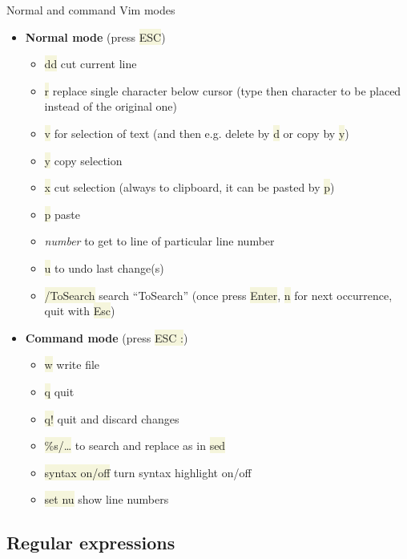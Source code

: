 \documentclass[compress, ucs, xelatex, 11pt, xcolor=svgnames, aspectratio=169,
	hyperref={
		bookmarks=true,
		unicode=true,
		colorlinks=true,
		pdftitle={Linux, command line and MetaCentrum},
		plainpages=false,
		pdfauthor={Vojtech Zeisek},
		pdfsubject={Course about use of Linux command line, writing shell scripts and using MetaCentrum of CESNET},
		pdfcreator={XeLaTeX},
		pdfkeywords={Linux, GNU, BASH, shell, command line, MetaCentrum},
		linkcolor=DarkRed, %
		anchorcolor=DarkBlue, %
		citecolor=Indigo, %
		filecolor=NavyBlue, %
		menucolor=DarkMagenta, %
		urlcolor=DarkBlue, %
		pdftex},
	url={hyphens, lowtilde} %
	]{beamer}
\renewcommand{\texttt}[1]{\colorbox{Beige}{{\ttfamily #1}}}
\begin{document}
\begin{frame}{Normal and command Vim modes}
	\begin{multicols}{2}
		\begin{itemize}
			\item \textbf{Normal mode} (press \texttt{ESC})
			\begin{itemize}
				\item \texttt{dd} cut current line
				\item \texttt{r} replace single character below cursor (type then character to be placed instead of the original one)
				\item \texttt{v} for selection of text (and then e.g. delete by \texttt{d} or copy by \texttt{y})
				\item \texttt{y} copy selection
				\item \texttt{x} cut selection (always to clipboard, it can be pasted by \texttt{p})
				\item \texttt{p} paste
				\item \textit{number} to get to line of particular line number
				\item \texttt{u} to undo last change(s)
				\item \texttt{/ToSearch} search \enquote{ToSearch} (once press \texttt{Enter}, \texttt{n} for next occurrence, quit with \texttt{Esc})
			\end{itemize}
			\item \textbf{Command mode} (press \texttt{ESC :})
			\begin{itemize}
				\item \texttt{w} write file
				\item \texttt{q} quit
				\item \texttt{q!} quit and discard changes
				\item \texttt{\%s/\ldots} to search and replace as in \texttt{sed}
				\item \texttt{syntax on/off} turn syntax highlight on/off
				\item \texttt{set nu} show line numbers
			\end{itemize}
		\end{itemize}
	\end{multicols}
\end{frame}

\subsection{Regular expressions}
\end{document}
